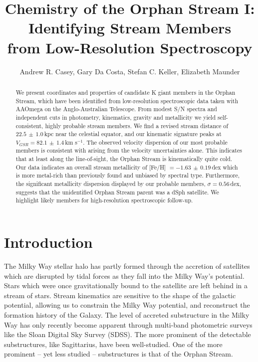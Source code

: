 \documentclass{emulateapj}
\begin{document}
\title{Chemistry of the Orphan Stream I: Identifying Stream Members \\ from Low-Resolution Spectroscopy}

\author{Andrew R. Casey, Gary Da Costa, Stefan C. Keller, Elizabeth Maunder}

\begin{abstract}
We present coordinates and properties of candidate K giant members in the Orphan Stream, which have been identified from low-resolution spectroscopic data taken with AAOmega on the Anglo-Australian Telescope. From modest S/N spectra and independent cuts in photometry, kinematics, gravity and metallicity we yield self-consistent, highly probable stream members. We find a revised stream distance of $22.5\,\pm\,1.0$\,kpc near the celestial equator, and our kinematic signature peaks at $V_{GSR} = 82.1\,\pm\,1.4$\,km s$^{-1}$. The observed velocity dispersion of our most probable members is consistent with arising from the velocity uncertainties alone. This indicates that at least along the line-of-sight, the Orphan Stream is kinematically quite cold. Our data indicates an overall stream metallicity of [Fe/H] $= -1.63\,\pm\,0.19$\,dex which is more metal-rich than previously found and unbiased by spectral type. Furthermore, the significant metallicity dispersion displayed by our probable members, $\sigma = 0.56$\,dex, suggests that the unidentified Orphan Stream parent was a dSph satellite. We highlight likely members for high-resolution spectroscopic follow-up.
\end{abstract}


\section{Introduction}
\label{sec:introduction}

The Milky Way stellar halo has partly formed through the accretion of satellites which are disrupted by tidal forces as they fall into the Milky Way's potential. Stars which were once gravitationally bound to the satellite are left behind in a stream of stars. Stream kinematics are sensitive to the shape of the galactic potential, allowing us to constrain the Milky Way potential, and reconstruct the formation history of the Galaxy. The level of accreted substructure in the Milky Way has only recently become apparent through multi-band photometric surveys like the Sloan Digital Sky Survey (SDSS). The more prominent of the detectable substructures, like Sagittarius, have been well-studied. One of the more prominent \--- yet less studied \--- substructures is that of the Orphan Stream. 
\end{document}
